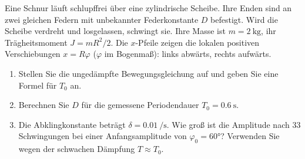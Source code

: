 \begin{ExerciseBlock}
Eine Schnur läuft schlupffrei über eine zylindrische Scheibe. Ihre Enden sind an zwei gleichen Federn mit unbekannter Federkonstante $D$ befestigt. Wird die Scheibe verdreht und losgelassen, schwingt sie. Ihre Masse ist $m=\qty{2}{\kilogram}$, ihr Trägheitsmoment $J=mR^2/2$.
Die $x$-Pfeile zeigen die lokalen positiven Verschiebungen $x=R\varphi$ ($\varphi$ im Bogenmaß): links abwärts, rechts aufwärts.
\begin{center}
\end{center}
\begin{enumerate}
\item Stellen Sie die ungedämpfte Bewegungsgleichung auf und geben Sie eine Formel für $T_0$ an.
\item Berechnen Sie $D$ für die gemessene Periodendauer $T_0=\qty{0.6}{\second}$.
\item Die Abklingkonstante beträgt $\delta=\qty{0.01}{\per\second}$. Wie groß ist die Amplitude nach 33 Schwingungen bei einer Anfangsamplitude von $\varphi_0=\ang{60}$? Verwenden Sie wegen der schwachen Dämpfung $T\approx T_0$.
\end{enumerate}
\end{ExerciseBlock}
